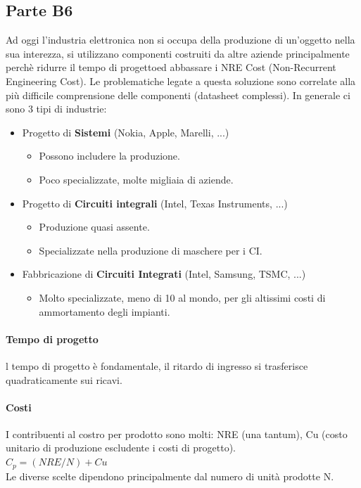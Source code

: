 \documentclass[12pt]{article}
\begin{document}
\subsection{Parte B6}\label{b6}
Ad oggi l'industria elettronica non si occupa della produzione di un'oggetto nella sua interezza, si utilizzano componenti costruiti da altre aziende principalmente perchè ridurre il tempo di progettoed abbassare i NRE Cost (Non-Recurrent Engineering Cost). Le problematiche legate a questa soluzione sono correlate alla più difficile comprensione delle componenti (datasheet complessi). In generale ci sono 3 tipi di industrie:
\begin{itemize}
  \item Progetto di \textbf{Sistemi} (Nokia, Apple, Marelli, ...)
  \begin{itemize}
    \item Possono includere la produzione.
    \item Poco specializzate, molte migliaia di aziende.
  \end{itemize}
  \item Progetto di \textbf{Circuiti integrali} (Intel, Texas Instruments, ...)
  \begin{itemize}
    \item Produzione quasi assente.
    \item Specializzate nella produzione di maschere per i CI.
  \end{itemize}
  \item Fabbricazione di \textbf{Circuiti Integrati} (Intel, Samsung, TSMC, ...)
  \begin{itemize}
    \item Molto specializzate, meno di 10 al mondo, per gli altissimi costi di ammortamento degli impianti.
  \end{itemize}
\end{itemize}

\paragraph{Tempo di progetto}
 l tempo di progetto è fondamentale, il ritardo di ingresso si trasferisce quadraticamente sui ricavi.
\paragraph{Costi} I contribuenti al costro per prodotto sono molti: NRE (una tantum), Cu (costo unitario di produzione escludente i costi di progetto).\\
$C_{p} = (NRE/N) + Cu$\\
Le diverse scelte dipendono principalmente dal numero di unità prodotte N.
\end{document}
